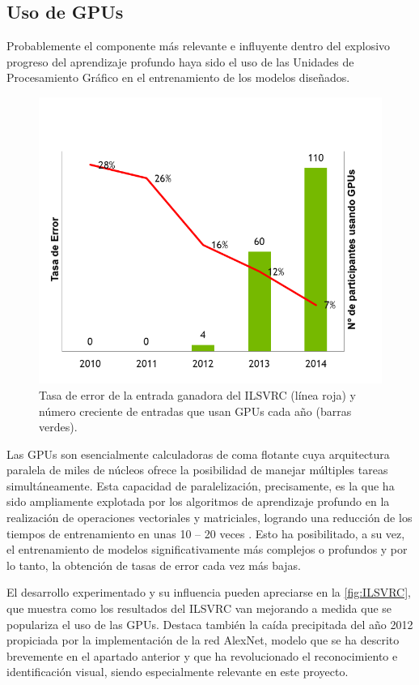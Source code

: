 \subsection{Uso de GPUs}

Probablemente el componente más relevante e influyente dentro del explosivo progreso del aprendizaje profundo haya sido el uso de las Unidades de Procesamiento Gráfico en el entrenamiento de los modelos diseñados.

\begin{figure}
    \centering
    \includegraphics[scale=0.8]{Images/ILSVRC.png}
    \caption{Tasa de error de la entrada ganadora del ILSVRC (línea roja) y número creciente de entradas que usan GPUs cada año (barras verdes).\cite{img:ILSVRC}}
    \label{fig:ILSVRC}
\end{figure}

Las GPUs son esencialmente calculadoras de coma flotante cuya arquitectura paralela de miles de núcleos ofrece la posibilidad de manejar múltiples tareas simultáneamente. Esta capacidad de paralelización, precisamente, es la que ha sido ampliamente explotada por los algoritmos de aprendizaje profundo en la realización de operaciones vectoriales y matriciales, logrando una reducción de los tiempos de entrenamiento en unas 10 -- 20 veces \cite{DeepLearning}. Esto ha posibilitado, a su vez, el entrenamiento de modelos significativamente más complejos o profundos y por lo tanto, la obtención de tasas de error cada vez más bajas.

El desarrollo experimentado y su influencia pueden apreciarse en la \autoref{fig:ILSVRC}, que muestra como los resultados del ILSVRC van mejorando a medida que se populariza el uso de las GPUs. Destaca también la caída precipitada del año 2012 propiciada por la implementación de la red AlexNet, modelo que se ha descrito brevemente en el apartado anterior y que ha revolucionado el reconocimiento e identificación visual, siendo especialmente relevante en este proyecto.

